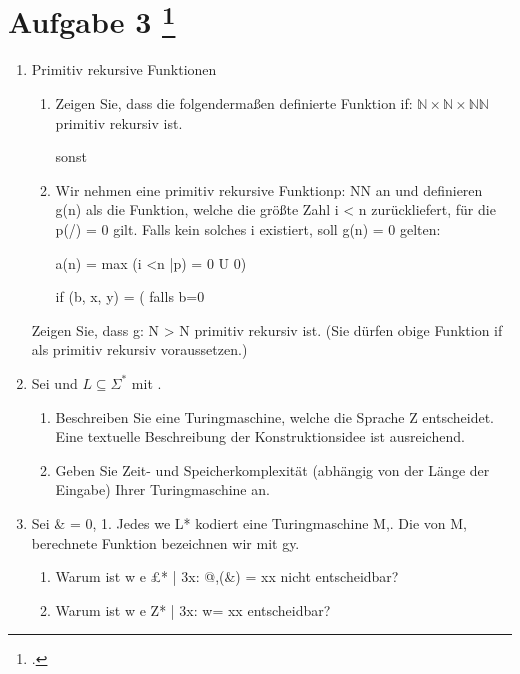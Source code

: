 \documentclass{lehramt-informatik-aufgabe}
\begin{document}
\section{Aufgabe 3
\footcite{66115:2017:03}}

\begin{enumerate}


\item Primitiv rekursive Funktionen

\begin{enumerate}


\item Zeigen Sie, dass die folgendermaßen definierte Funktion
if: $\mathbb{N} \times \mathbb{N} \times \mathbb{N}
\mathbb{N}$ primitiv rekursiv ist.

sonst


\item Wir nehmen eine primitiv rekursive Funktionp: NN an und definieren
g(n) als die Funktion, welche die größte Zahl i < n zurückliefert, für
die p(/) = 0 gilt. Falls kein solches i existiert, soll g(n) = 0 gelten:

a(n) = max ({i <n |p) = 0} U {0})

if (b, x, y) = ( falls b=0
\end{enumerate}

Zeigen Sie, dass g: N > N primitiv rekursiv ist. (Sie dürfen obige
Funktion if als primitiv rekursiv voraussetzen.)

\item Sei  und $L \subseteq \Sigma^*$ mit
.
\begin{enumerate}


\item Beschreiben Sie eine Turingmaschine, welche die Sprache Z
entscheidet. Eine textuelle Beschreibung der Konstruktionsidee ist
ausreichend.


\item Geben Sie Zeit- und Speicherkomplexität (abhängig von der Länge
der Eingabe) Ihrer Turingmaschine an.
\end{enumerate}

\item Sei \& = {0, 1}. Jedes we L* kodiert eine Turingmaschine M,. Die
von M, berechnete Funktion bezeichnen wir mit gy.

\begin{enumerate}


\item Warum ist {w e £* | 3x: @,(\&) = xx} nicht entscheidbar?


\item Warum ist {w e Z* | 3x: w= xx} entscheidbar?

\end{enumerate}
\end{enumerate}
\end{document}
